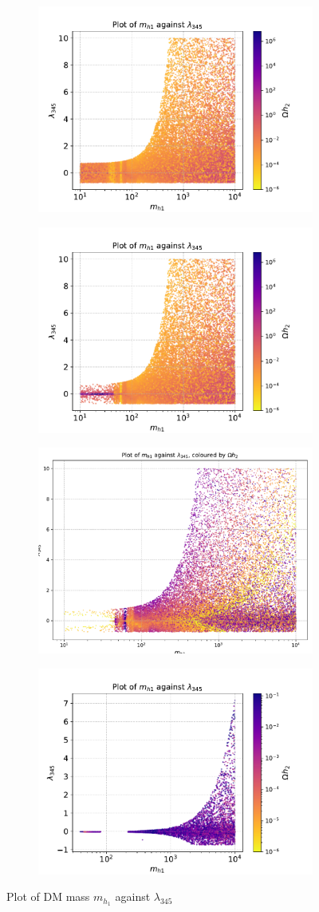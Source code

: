 \documentclass[12pt]{article}
\begin{document}
\begin{figure}[H]
\begin{subfigure}{\textwidth}
  \centering
  \includegraphics[width=0.25\columnwidth]{plots/MD1_l345_cut1.pdf}
\end{subfigure}%
\begin{subfigure}{\textwidth}
  \centering
  \includegraphics[width=0.25\columnwidth]{plots/MD1_l345_cut1cut2.pdf}
\end{subfigure}
\begin{subfigure}{\textwidth}
  \centering
  \includegraphics[width=0.25\columnwidth]{plots1/MD1_l345_cut1cut2cut3.pdf}
\end{subfigure}
\begin{subfigure}{\textwidth}
  \centering
  \includegraphics[width=0.25\columnwidth]{plots/MD1_l345_cut1cut2cut3cut4.pdf}
\end{subfigure}
\caption{Plot of DM mass $m_{h_1}$ against $\lambda_{345}$}
\label{fig:input noise}
\end{figure}

\twocolumn
\end{document}
